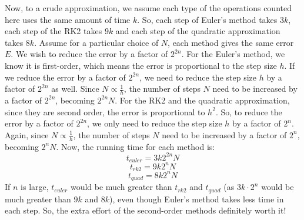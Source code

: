 \documentclass{article}
\begin{document}
Now, to a crude approximation, we assume each type of the operations counted here uses the same amount of time \(k\).
So, each step of Euler's method takes \(3k\), each step of the RK2 takes \(9k\) and each step of the quadratic approximation
takes \(8k\). Assume for a particular choice of \(N\), each method gives the same error \(E\). We wish to reduce the
error by a factor of \(2^{2n}\). For the Euler's method, we know it is first-order, which means
the error is proportional to the step size \(h\). If we reduce the error by a factor of \(2^{2n}\),
we need to reduce the step size \(h\) by a factor of \(2^{2n}\) as well. Since \(N \propto \frac{1}{h}\),
the number of steps \(N\) need to be increased by a factor of \(2^{2n}\), becoming \(2^{2n}N\).
For the RK2 and the quadratic approximation, since they are second order, the error is proportional to \(h^2\).
So, to reduce the error by a factor of \(2^{2n}\), we only need to reduce the step size \(h\) by a factor of \(2^n\).
Again, since  \(N \propto \frac{1}{h}\), the number of steps \(N\) need to be increased by a factor of \(2^{n}\), becoming \(2^{n}N\).
Now, the running time for each method is:
\begin{equation}
  t_{euler} = 3k 2^{2n}N
\end{equation}
\begin{equation}
  t_{rk2} = 9k 2^{n}N
\end{equation}
\begin{equation}
  t_{quad} = 8k 2^{n}N
\end{equation}
If \(n\) is large, \(t_{euler}\) would be much greater than \(t_{rk2}\) and \(t_{quad}\) (as \(3k\cdot 2^{n}\) would be much greater than \(9k\) and \(8k\)), even though
Euler's method takes less time in each step. So, the extra effort of the second-order methods definitely worth it!
\pagebreak
\end{document}
